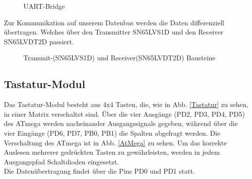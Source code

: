 \begin{figure}[H]
    \centering    
    \caption{UART-Bridge}
    \label{USB}
\end{figure}

Zur Kommunikation auf unserem Datenbus werden die Daten differenziell übertragen. Welches über den Transmitter SN65LVS1D und den Receiver SN65LVDT2D passiert.

\begin{figure}[H]
    \centering    
    \caption{Transmit-(SN65LVS1D) und Receiver(SN65LVDT2D) Bausteine }
    \label{T_R_Bausteine}
\end{figure}

\subsection{Tastatur-Modul}
Das Tastatur-Modul besteht aus 4x4 Tasten, die, wie in Abb. \ref{Tastatur} zu sehen, in einer Matrix verschaltet sind. Über die vier Ausgänge (PD2, PD3, PD4, PD5) des  ATmega werden nacheinander 
Ausgangssignale gegeben, während über die vier Eingänge (PD6, PD7, PB0, PB1) die Spalten abgefragt werden. Die Verschaltung des ATmega ist in Abb. \ref{AtMega} zu sehen. Um das korrekte Auslesen mehrerer gedrückten Tasten zu gewährleisten, werden in jedem 
Ausgangspfad Schaltdioden eingesetzt. \\
Die Datenübertragung findet über die Pins PD0 und PD1 statt.


